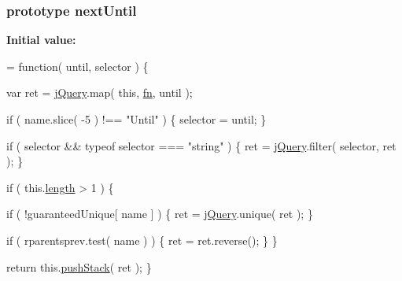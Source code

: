 \subsubsection[{next\+Until}]{ {\bf prototype} next\+Until}\label{jquery-1_810_82-vsdoc_8js_af68b07d83c395633085335fd87872672}
{\bfseries Initial value\+:}
\begin{DoxyCode}
= \textcolor{keyword}{function}( until, selector ) \{


        var ret = \hyperlink{jquery-1_810_82-vsdoc_8js_add5237586d970a38a81f990e8eb28c6c}{jQuery}.map( \textcolor{keyword}{this}, \hyperlink{jquery-1_810_82-vsdoc_8js_acef6bdaf6b9b20fdcca1ea86f0902c3b}{fn}, until );

        \textcolor{keywordflow}{if} ( name.slice( -5 ) !== \textcolor{stringliteral}{"Until"} ) \{
            selector = until;
        \}

        \textcolor{keywordflow}{if} ( selector && typeof selector === \textcolor{stringliteral}{"string"} ) \{
            ret = \hyperlink{jquery-1_810_82-vsdoc_8js_add5237586d970a38a81f990e8eb28c6c}{jQuery}.filter( selector, ret );
        \}

        \textcolor{keywordflow}{if} ( this.\hyperlink{jquery-1_810_82-vsdoc_8js_aa7de35d58da66d9944ab9cbe82c19640}{length} > 1 ) \{
            
            \textcolor{keywordflow}{if} ( !guaranteedUnique[ name ] ) \{
                ret = \hyperlink{jquery-1_810_82-vsdoc_8js_add5237586d970a38a81f990e8eb28c6c}{jQuery}.unique( ret );
            \}

            
            \textcolor{keywordflow}{if} ( rparentsprev.test( name ) ) \{
                ret = ret.reverse();
            \}
        \}

        \textcolor{keywordflow}{return} this.\hyperlink{jquery-1_810_82-vsdoc_8js_afc3a7db1ef2b526338c06c07cecccd44}{pushStack}( ret );
    \}
\end{DoxyCode}
\hypertarget{jquery-1_810_82-vsdoc_8js_aa31bbacd7a4c583bc450398f96a6f439}{}
